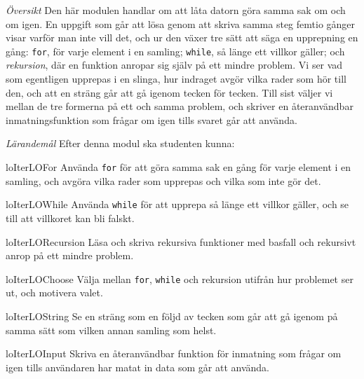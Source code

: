 \emph{Översikt}
Den här modulen handlar om att låta datorn göra samma sak om och om igen.
En uppgift som går att lösa genom att skriva samma steg femtio gånger
visar varför man inte vill det, och ur den växer tre sätt att säga en
upprepning en gång: \texttt{for}, för varje element i en
samling; \texttt{while}, så länge ett villkor gäller; och
\emph{rekursion}, där en funktion anropar sig själv på ett mindre
problem.  Vi ser vad som egentligen upprepas i en slinga, hur indraget
avgör vilka rader som hör till den, och att en sträng går att gå igenom
tecken för tecken.  Till sist väljer vi mellan de tre formerna på ett
och samma problem, och skriver en återanvändbar inmatningsfunktion som
frågar om igen tills svaret går att använda.

\emph{Lärandemål}
Efter denna modul ska studenten kunna:
\begin{restatable}{lo}{IterLOFor}\label{IterLOFor}%
  Använda \texttt{for} för att göra samma sak en gång för
  varje element i en samling, och avgöra vilka rader som upprepas och
  vilka som inte gör det. %
\end{restatable}
\begin{restatable}{lo}{IterLOWhile}\label{IterLOWhile}%
  Använda \texttt{while} för att upprepa så länge ett villkor
  gäller, och se till att villkoret kan bli falskt. %
\end{restatable}
\begin{restatable}{lo}{IterLORecursion}\label{IterLORecursion}%
  Läsa och skriva rekursiva funktioner med basfall och rekursivt anrop på
  ett mindre problem. %
\end{restatable}
\begin{restatable}{lo}{IterLOChoose}\label{IterLOChoose}%
  Välja mellan \texttt{for}, \texttt{while} och
  rekursion utifrån hur problemet ser ut, och motivera valet. %
\end{restatable}
\begin{restatable}{lo}{IterLOString}\label{IterLOString}%
  Se en sträng som en följd av tecken som går att gå igenom på samma sätt
  som vilken annan samling som helst. %
\end{restatable}
\begin{restatable}{lo}{IterLOInput}\label{IterLOInput}%
  Skriva en återanvändbar funktion för inmatning som frågar om igen tills
  användaren har matat in data som går att använda. %
\end{restatable}

